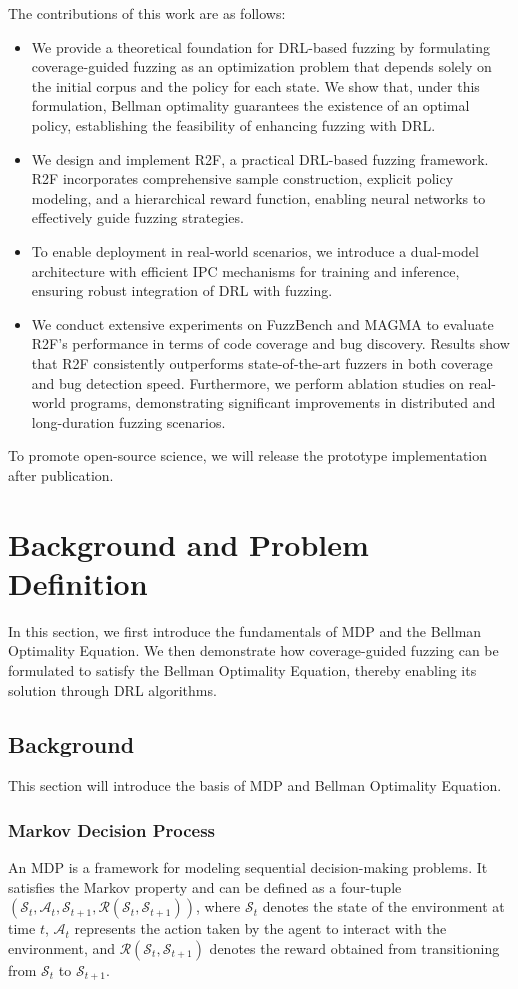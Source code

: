 \documentclass[lettersize,journal]{IEEEtran}
\begin{document}
The contributions of this work are as follows:
\begin{itemize}
	\item We provide a theoretical foundation for DRL-based fuzzing by formulating coverage-guided fuzzing as an optimization problem that depends solely on the initial corpus and the policy for each state. We show that, under this formulation, Bellman optimality guarantees the existence of an optimal policy, establishing the feasibility of enhancing fuzzing with DRL.
	\item We design and implement R2F, a practical DRL-based fuzzing framework. R2F incorporates comprehensive sample construction, explicit policy modeling, and a hierarchical reward function, enabling neural networks to effectively guide fuzzing strategies.
	\item To enable deployment in real-world scenarios, we introduce a dual-model architecture with efficient IPC mechanisms for training and inference, ensuring robust integration of DRL with fuzzing.
	\item We conduct extensive experiments on FuzzBench and MAGMA to evaluate R2F’s performance in terms of code coverage and bug discovery. Results show that R2F consistently outperforms state-of-the-art fuzzers in both coverage and bug detection speed. Furthermore, we perform ablation studies on real-world programs, demonstrating significant improvements in distributed and long-duration fuzzing scenarios.
\end{itemize}

To promote open-source science, we will release the prototype implementation after publication.

\section{Background and Problem Definition}\label{sec:background}
In this section, we first introduce the fundamentals of MDP and the Bellman Optimality Equation. We then demonstrate how coverage-guided fuzzing can be formulated to satisfy the Bellman Optimality Equation, thereby enabling its solution through DRL algorithms.
\subsection{Background}
This section will introduce the basis of MDP and Bellman Optimality Equation.
\subsubsection{Markov Decision Process}
An MDP is a framework for modeling sequential decision-making problems. It satisfies the Markov property and can be defined as a four-tuple $\left(\mathcal{S}_{t}, \mathcal{A}_{t}, \mathcal{S}_{t+1}, \mathcal{R}(\mathcal{S}_{t}, \mathcal{S}_{t+1})\right)$, where $\mathcal{S}_t$ denotes the state of the environment at time $t$, $\mathcal{A}_t$ represents the action taken by the agent to interact with the environment, and $\mathcal{R}(\mathcal{S}_{t}, \mathcal{S}_{t+1})$ denotes the reward obtained from transitioning from $\mathcal{S}_t$ to $\mathcal{S}_{t+1}$.
\end{document}
